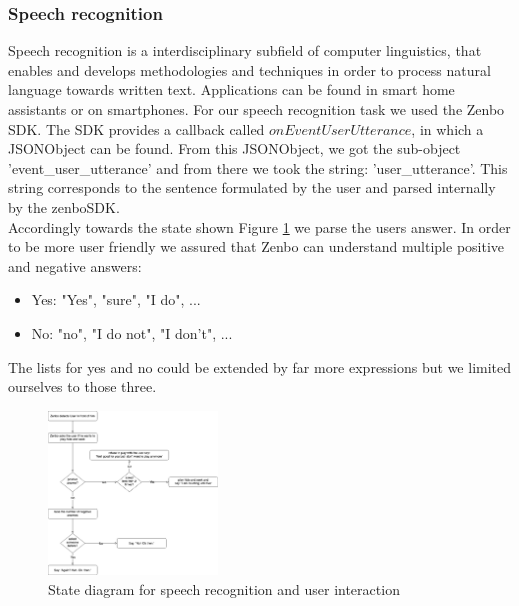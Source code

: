 \documentclass[conference]{IEEEtran}
\begin{document}
\subsubsection{Speech recognition} \label{sec:speechreconition}
Speech recognition is a interdisciplinary subfield of computer linguistics, that enables and develops methodologies and techniques in order to process 
natural language towards written text. \cite{b4}  Applications can be found in smart home assistants or on smartphones.
For our speech recognition task we used the Zenbo SDK. The SDK provides a callback called $onEventUserUtterance$, in which a JSONObject can be found.
From this JSONObject, we got the sub-object 'event\_user\_utterance' and from there we took the string: 'user\_utterance'. This string 
corresponds to the sentence formulated by the user and parsed internally by the zenboSDK.\\
Accordingly towards the state shown Figure \ref{fig:zenboSpeech} we parse the users answer.
In order to be more user friendly we assured that Zenbo can understand multiple positive and negative answers:
\begin{itemize}
	\item Yes: "Yes", "sure", "I do", ...
	\item No: "no", "I do not", "I don't", ...
\end{itemize}
The lists for yes and no could be extended by far more expressions but we limited ourselves to those three.\\
\begin{figure}  \label{fig:zenboSpeech}
	\begin{center}
		\includegraphics[width=0.4\textwidth]{pics/ZenboSpeech.png}
	\end{center}
	\caption{State diagram for speech recognition and user interaction}
\end{figure}\\
\end{document}

